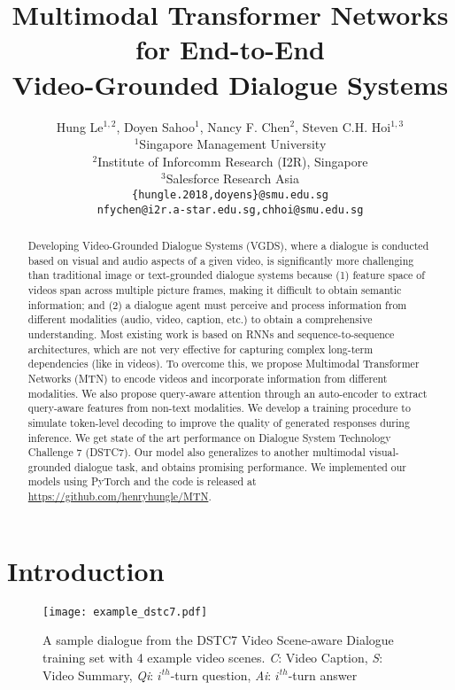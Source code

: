 \documentclass[11pt,a4paper]{article}
\title{Multimodal Transformer Networks for End-to-End \\Video-Grounded Dialogue Systems}
\author{Hung Le$^{1,2}$, Doyen Sahoo$^1$, Nancy F. Chen$^2$, Steven C.H. Hoi$^{1,3}$ \\
  $^1$Singapore Management University \\
  $^2$Institute of Inforcomm Research (I2R), Singapore \\
  $^3$Salesforce Research Asia \\
  \texttt{\{hungle.2018,doyens\}@smu.edu.sg}\\
  \texttt{nfychen@i2r.a-star.edu.sg,chhoi@smu.edu.sg}
 }
\date{}
\begin{document}
\maketitle

\begin{abstract}
Developing Video-Grounded Dialogue Systems (VGDS), where a dialogue is conducted based on visual and audio aspects of a given video, is significantly more challenging than traditional image or text-grounded dialogue systems because 
(1) feature space of videos span across multiple picture frames, making it difficult to obtain semantic information; and (2) a dialogue agent must perceive and process information from different modalities (audio, video, caption, etc.) to obtain a comprehensive understanding.  Most existing work is based on RNNs and sequence-to-sequence architectures, which are not very effective for capturing complex long-term dependencies (like in videos).  To overcome this, we propose Multimodal Transformer Networks (MTN) to encode videos and incorporate information from different modalities. We also propose query-aware attention through an auto-encoder to extract query-aware features from non-text modalities. We develop a training procedure to simulate token-level decoding to improve the quality of generated responses during inference. We get state of the art performance on Dialogue System Technology Challenge 7 (DSTC7). Our model also generalizes to another multimodal visual-grounded dialogue task, and obtains promising performance.  We implemented our models using PyTorch and the code is released at \url{https://github.com/henryhungle/MTN}.

\end{abstract}

\section{Introduction}


\begin{figure}[h]
    \centering
	\texttt{[image: example\_dstc7.pdf]}
\caption{A sample dialogue from the DSTC7 Video Scene-aware Dialogue training set with 4 example video scenes. \textit{C}: Video Caption, \textit{S}: Video Summary, \textit{Qi}: $i^{th}$-turn question, \textit{Ai}: $i^{th}$-turn answer}
	\label{fig:data}
	\vspace{-0.5cm}
\end{figure}
\end{document}
